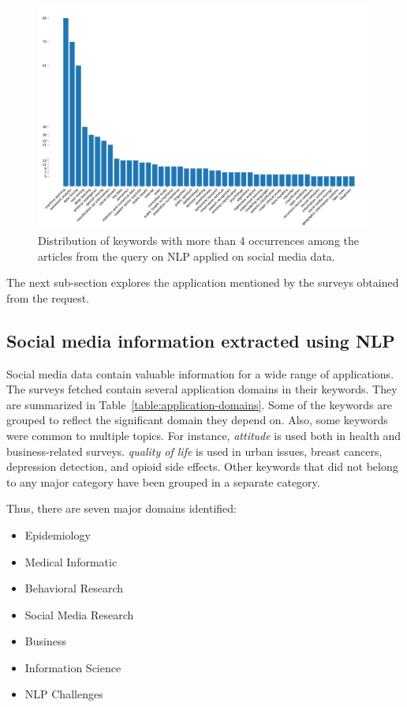 \begin{figure}[htb]
    \centering
    \includegraphics[width=\textwidth]{figures/chap-2/nlp-bar.pdf}
    \caption{Distribution of keywords with more than 4 occurrences among the articles from the query on NLP applied on social media data.}
    \label{literature:nlp-bar}
\end{figure}

The next sub-section explores the application mentioned by the surveys obtained from the request.

\subsection{Social media information extracted using NLP}
Social media data contain valuable information for a wide range of applications.
The surveys fetched contain several application domains in their keywords.
They are summarized in Table~\ref{table:application-domains}.
Some of the keywords are grouped to reflect the significant domain they depend on.
Also, some keywords were common to multiple topics.
For instance, \emph{attitude} is used both in health and business-related surveys.
\emph{quality of life} is used in urban issues, breast cancers, depression detection, and opioid side effects.
Other keywords that did not belong to any major category have been grouped in a separate category.

Thus, there are seven major domains identified:

\begin{itemize}
    \item Epidemiology
    \item Medical Informatic
    \item Behavioral Research
    \item Social Media Research
    \item Business
    \item Information Science
    \item NLP Challenges
\end{itemize}

